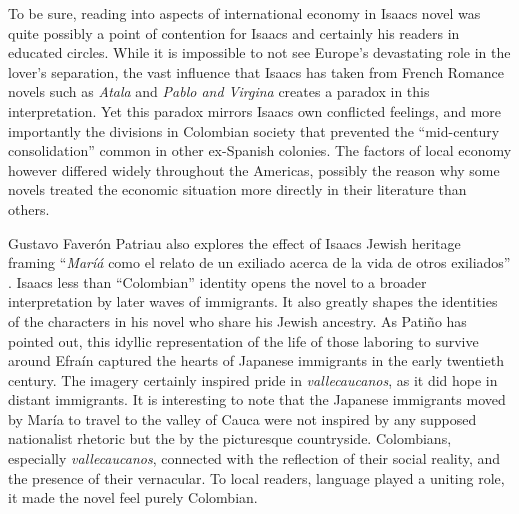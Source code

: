 To be sure, reading into aspects of international economy in Isaacs novel was quite possibly a point of contention for Isaacs and certainly his readers in educated circles.
While it is impossible to not see Europe's devastating role in the lover's separation, the vast influence that Isaacs has taken from French Romance novels such as \textit{Atala} and \textit{Pablo and Virgina} creates a paradox in this interpretation.
Yet this paradox mirrors  Isaacs own conflicted feelings, and more importantly the divisions in Colombian society that prevented the \enquote{mid-century consolidation} common in other ex-Spanish colonies.
The factors of local economy however differed widely throughout the Americas, possibly the reason why some novels treated the economic situation more directly in their literature than others.

Gustavo Faverón Patriau also explores the effect of Isaacs Jewish heritage framing \enquote{\textit{Maríá} como el relato de un exiliado acerca de la vida de otros exiliados} \autocite[341]{Patriau2004}.
Isaacs less than \enquote{Colombian} identity opens the novel to a broader interpretation by later waves of immigrants.
It also greatly shapes the identities of the characters in his novel who share his Jewish ancestry.
As Patiño has pointed out, this idyllic representation of the life of those laboring to survive around Efraín captured the hearts of Japanese immigrants in the early twentieth century. 
The imagery certainly inspired pride in \textit{vallecaucanos}, as it did hope in distant immigrants. 
It is interesting to note that the Japanese immigrants moved by María to travel to the valley of Cauca were not inspired by any supposed nationalist rhetoric but the by the picturesque countryside.
Colombians, especially \textit{vallecaucanos}, connected with the reflection of their social reality, and the presence of their vernacular. 
To local readers, language played a uniting role, it made the novel feel purely Colombian. 


